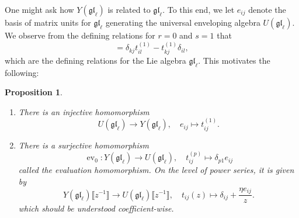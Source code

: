 \documentclass[11pt]{report}
\newtheorem{prop}[theorem]{Proposition}
\theoremstyle{definition}
\theoremstyle{remark}
\theoremstyle{remark}
\begin{document}
One might ask how $Y(\mathfrak{gl}_\ell)$ is related to $\mathfrak{gl}_\ell$. To this end, we let $e_{ij}$ denote the basis of matrix units for $\mathfrak{gl}_\ell$ generating the universal enveloping algebra $U(\mathfrak{gl}_\ell)$. We observe from the defining relations for $r=0$ and $s=1$ that
\begin{equation*}
[t_{ij}^{(1)},t_{kl}^{(1)}] = \delta_{kj} t_{il}^{(1)} - t_{kj}^{(1)} \delta_{il},
\end{equation*}
which are the defining relations for the Lie algebra $\mathfrak{gl}_\ell$. This motivates the following:

\begin{prop}
\begin{enumerate}[label=(\roman*)]
\item There is an injective homomorphism
\begin{equation*}
U(\mathfrak{gl}_\ell) \to Y(\mathfrak{gl}_\ell), \quad e_{ij} \mapsto t_{ij}^{(1)}.
\end{equation*}
\item There is a surjective homomorphism
\begin{equation*}
\operatorname{ev}_0: Y(\mathfrak{gl}_\ell) \to U(\mathfrak{gl}_\ell), \quad t_{ij}^{(p)} \mapsto \delta_{p1} e_{ij}
\end{equation*}
called the \emph{evaluation homomorphism}. On the level of power series, it is given by
\begin{equation*}
Y(\mathfrak{gl}_\ell)\llbracket z^{-1} \rrbracket \to U(\mathfrak{gl}_\ell)\llbracket z^{-1} \rrbracket, \quad t_{ij}(z) \mapsto \delta_{ij} + \frac{\eta e_{ij}}{z}.
\end{equation*}
which should be understood coefficient-wise.
\end{enumerate}
\end{prop}
\end{document}
